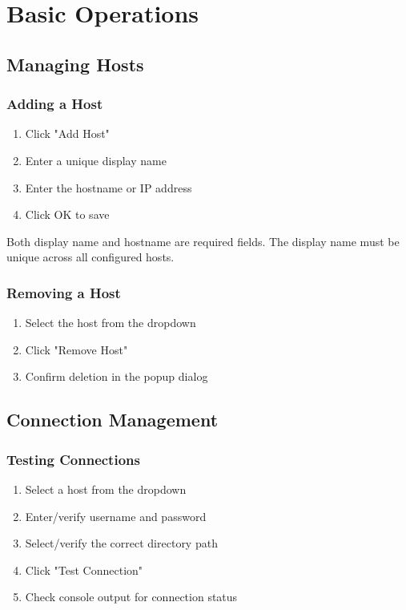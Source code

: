 \documentclass[a4paper,11pt]{report}
\begin{document}
\chapter{Basic Operations}

\section{Managing Hosts}

\subsection{Adding a Host}
\begin{procedurebox}
\begin{enumerate}
    \item Click "Add Host"
    \item Enter a unique display name
    \item Enter the hostname or IP address
    \item Click OK to save
\end{enumerate}
\end{procedurebox}

\begin{warningbox}
Both display name and hostname are required fields. The display name must be unique across all configured hosts.
\end{warningbox}

\subsection{Removing a Host}
\begin{procedurebox}
\begin{enumerate}
    \item Select the host from the dropdown
    \item Click "Remove Host"
    \item Confirm deletion in the popup dialog
\end{enumerate}
\end{procedurebox}

\section{Connection Management}

\subsection{Testing Connections}
\begin{procedurebox}
\begin{enumerate}
    \item Select a host from the dropdown
    \item Enter/verify username and password
    \item Select/verify the correct directory path
    \item Click "Test Connection"
    \item Check console output for connection status
\end{enumerate}
\end{procedurebox}
\end{document}
